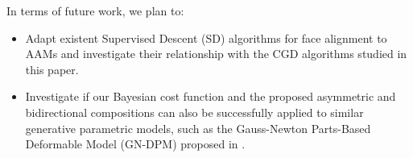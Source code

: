 In terms of future work, we plan to:
\begin{itemize}
	\item Adapt existent Supervised Descent (SD) algorithms for face alignment \cite{Xiong2013, Tzimiropoulos2015} to AAMs and investigate their relationship with the CGD algorithms studied in this paper. 
	
	\item Investigate if our Bayesian cost function and the proposed asymmetric and bidirectional compositions can also be successfully applied to similar generative parametric models, such as the Gauss-Newton Parts-Based Deformable Model (GN-DPM) proposed in \cite{Tzimiropoulos2014}.   
\end{itemize} 